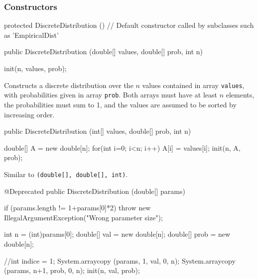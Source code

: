 \subsubsection* {Constructors}

\begin{code}\begin{hide}

   protected DiscreteDistribution () {}
   // Default constructor called by subclasses such as 'EmpiricalDist'
\end{hide}

   public DiscreteDistribution (double[] values, double[] prob, int n)\begin{hide} {
      init(n, values, prob);
   }\end{hide}
\end{code}
\begin{tabb} Constructs a discrete distribution over the $n$ values
 contained in array \texttt{values}, with probabilities given in array \texttt{prob}.
 Both arrays must have at least $n$ elements, the probabilities must
 sum to 1, and the values are assumed to be sorted by increasing order.
\end{tabb}
\begin{code}

   public DiscreteDistribution (int[] values, double[] prob, int n)\begin{hide} {
      double[] A = new double[n];
      for(int i=0; i<n; i++)
         A[i] = values[i];
      init(n, A, prob);
   }\end{hide}
\end{code}
\begin{tabb} Similar to
\texttt{(double[], double[], int)}.
\end{tabb}
\begin{code}

   @Deprecated
   public DiscreteDistribution (double[] params)\begin{hide} {
      if (params.length != 1+params[0]*2)
         throw new IllegalArgumentException("Wrong parameter size");

      int n =  (int)params[0];
      double[] val = new double[n];
      double[] prob = new double[n];

      //int indice = 1;
      System.arraycopy (params, 1, val, 0, n);
      System.arraycopy (params, n+1, prob, 0, n);
      init(n, val, prob);
    }\end{hide}
\end{code}
